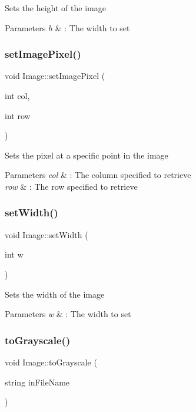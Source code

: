 Sets the height of the image 
\begin{DoxyParams}{Parameters}
{\em h} & \+: The width to set \\
\hline
\end{DoxyParams}
\mbox{\label{classImage_a935a28e2ea0fe6f1daef70f3cf4042bc}} 
\subsubsection{\texorpdfstring{set\+Image\+Pixel()}{setImagePixel()}}
{\footnotesize\ttfamily void Image\+::set\+Image\+Pixel (\begin{DoxyParamCaption}\item[{int}]{col,  }\item[{int}]{row }\end{DoxyParamCaption})}

Sets the pixel at a specific point in the image 
\begin{DoxyParams}{Parameters}
{\em col} & \+: The column specified to retrieve \\
\hline
{\em row} & \+: The row specified to retrieve \\
\hline
\end{DoxyParams}
\mbox{\label{classImage_a385abd0ecca8787fe15d9a72ac60001a}} 
\subsubsection{\texorpdfstring{set\+Width()}{setWidth()}}
{\footnotesize\ttfamily void Image\+::set\+Width (\begin{DoxyParamCaption}\item[{int}]{w }\end{DoxyParamCaption})}

Sets the width of the image 
\begin{DoxyParams}{Parameters}
{\em w} & \+: The width to set \\
\hline
\end{DoxyParams}
\mbox{\label{classImage_a28cae6978dd1876f7a47760511f077ec}} 
\subsubsection{\texorpdfstring{to\+Grayscale()}{toGrayscale()}}
{\footnotesize\ttfamily void Image\+::to\+Grayscale (\begin{DoxyParamCaption}\item[{string}]{in\+File\+Name }\end{DoxyParamCaption})}

